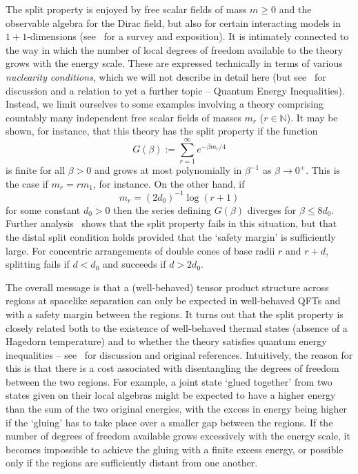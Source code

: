 \documentclass[12pt,a4paper]{article}
\newcommand{\1}{\mathds{1}}                         %
\newcommand{\NN}{\mathbb{N}}          %
\begin{document}
The split property is enjoyed by free scalar fields of mass $m\ge 0$ and the observable algebra for the Dirac field, but also for certain interacting models in $1+1$-dimensions (see~\cite{Lech_chap:2015} for a survey and exposition).
It is intimately connected to the way in which the number of local degrees of freedom available to the theory grows with the energy scale.
These are expressed technically in terms of various \emph{nuclearity conditions}, which we will not describe in detail here (but see~\cite{Fewster_Abh:2016} for discussion and a relation to yet a further topic -- Quantum Energy Inequalities). Instead, we limit ourselves to some examples involving a theory comprising countably many independent free scalar fields of masses $m_r$ ($r\in \NN$). It may be shown, for instance, that this theory has the split property if the function
\[
G(\beta):= \sum_{r=1}^\infty e^{-\beta m_r/4}
\]
is finite for all $\beta>0$ and grows at most polynomially in $\beta^{-1}$ as $\beta\to 0^+$. This is the case if $m_r=rm_1$, for instance. On the other hand, if 
\[
m_r = (2d_0)^{-1}\log(r+1)
\]
for some constant $d_0>0$ then the series defining $G(\beta)$ diverges for $\beta\le 8d_0$. 
Further analysis~\cite[Thm 4.3]{DAnDopFreLon:1987} shows that the split property fails in this situation, but that the distal split condition holds provided that the `safety margin' is sufficiently large. For concentric arrangements of double cones of base radii $r$ and $r+d$, splitting fails if $d<d_0$ and succeeds if $d>2d_0$. 

The overall message is that a (well-behaved) tensor product structure across regions at spacelike separation can only be expected in well-behaved QFTs and with a safety margin between the regions. It turns out that the split property is closely related both to the existence of well-behaved thermal states (absence of a Hagedorn temperature) and to whether the theory satisfies quantum energy inequalities -- see~\cite{Fewster_Abh:2016} for discussion and original references. Intuitively, the reason for this is that there is a cost associated with disentangling the degrees of freedom between the two regions. For example, a joint state `glued together' from two states given on their local algebras might be expected to have a higher energy than the sum of the two original energies, with the excess in energy being higher if the `gluing' has to take place over a smaller gap between the regions. If the number of degrees of freedom available grows excessively with the energy scale, it becomes impossible to achieve the gluing with a finite excess energy, or possible only if the regions are sufficiently distant from one another. 
 
\end{document}
